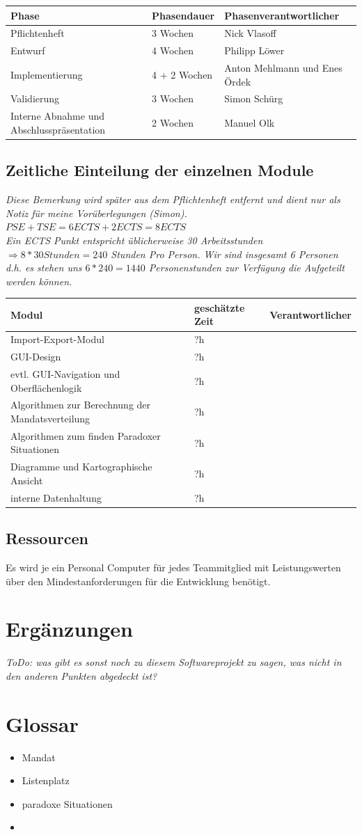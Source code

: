 \documentclass[10pt,a4paper]{article}
\begin{document}
\begin{tabular}[h]{lll}
	\hline
	\textbf{Phase} & \textbf{Phasendauer} & \textbf{Phasenverantwortlicher} \\
	\hline
	Pflichtenheft & 3 Wochen & Nick Vlasoff \\
	Entwurf & 4 Wochen & Philipp Löwer \\
	Implementierung & 4 + 2 Wochen & Anton Mehlmann und Enes Ördek \\
	Validierung & 3 Wochen & Simon Schürg \\
	Interne Abnahme und Abschlusspräsentation & 2 Wochen & Manuel Olk \\
	\hline
\end{tabular}

\subsection{Zeitliche Einteilung der einzelnen Module}
\textit{Diese Bemerkung wird später aus dem Pflichtenheft entfernt und dient nur als Notiz für meine Vorüberlegungen (Simon).\\ $PSE + TSE = 6 ECTS + 2 ECTS = 8 ECTS$\\
Ein ECTS Punkt entspricht üblicherweise 30 Arbeitsstunden $\Rightarrow 8 * 30 Stunden = 240$ Stunden Pro Person. Wir sind insgesamt 6 Personen d.h. es stehen uns $6 * 240 = 1440$ Personenstunden zur Verfügung die Aufgeteilt werden können. }

\begin{tabular}[h]{lll}
	\hline
	\textbf{Modul} & \textbf{geschätzte Zeit} & \textbf{Verantwortlicher} \\
	\hline
	Import-Export-Modul & ?h &  \\
	GUI-Design & ?h &  \\
	evtl. GUI-Navigation und Oberflächenlogik & ?h &  \\
	Algorithmen zur Berechnung der Mandatsverteilung & ?h &  \\
	Algorithmen zum finden Paradoxer Situationen  & ?h &  \\
	Diagramme und Kartographische Ansicht  & ?h &  \\
	interne Datenhaltung  & ?h &  \\
	\hline
\end{tabular}

\subsection{Ressourcen}
Es wird je ein Personal Computer für jedes Teammitglied mit Leistungswerten über den Mindestanforderungen für die Entwicklung benötigt.


\section{Ergänzungen}
\textit{ToDo: was gibt es sonst noch zu diesem Softwareprojekt zu sagen, was nicht in den anderen Punkten abgedeckt ist?}

\section{Glossar}
\begin{itemize}
	\item Mandat
	\item Listenplatz
	\item paradoxe Situationen
	\item 
\end{itemize}
\end{document}
